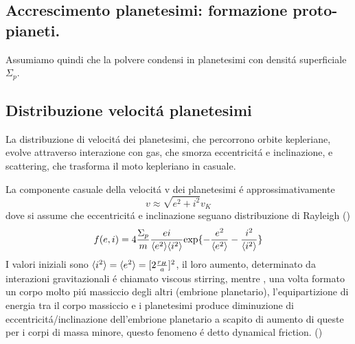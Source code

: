 \begin{reworking}
\section{Accrescimento planetesimi: formazione proto-pianeti.}

Assumiamo quindi che la polvere condensi in planetesimi con densit\'a superficiale $\Sigma_p$.
\subsection{Distribuzione velocit\'a planetesimi}
La distribuzione di velocit\'a dei planetesimi, che percorrono orbite kepleriane, evolve attraverso interazione con gas, che smorza eccentricit\'a e inclinazione, e scattering, che trasforma il moto kepleriano in casuale.


La componente casuale della velocit\'a v dei planetesimi \'e approssimativamente
\begin{equation}
v\approx\sqrt{e^2+i^2}v_K
\end{equation}
dove si assume che eccentricit\'a e inclinazione seguano distribuzione di Rayleigh (\cite{ida1992n})
\begin{equation}
f(e,i)=4\frac{\Sigma_p}{m}\frac{ei}{\langle e^2 \rangle\langle i^2 \rangle}\text{exp}\{-\frac{e^2}{\langle e^2 \rangle}-\frac{i^2}{\langle i^2 \rangle}\}
\end{equation}
I valori iniziali sono $\langle i^2 \rangle=\langle e^2 \rangle=[2\frac{r_H}{a}]^2$, il loro aumento, determinato da interazioni gravitazionali \'e chiamato viscous stirring, mentre , una volta formato un corpo molto pi\'u massiccio degli altri (embrione planetario), l'equipartizione di energia tra il corpo massiccio e i planetesimi produce diminuzione di eccentricit\'a/inclinazione dell'embrione planetario a scapito di aumento di queste per i corpi di massa minore, questo fenomeno \'e detto dynamical friction. (\cite{kokubo2012dynamics})


\end{reworking}
